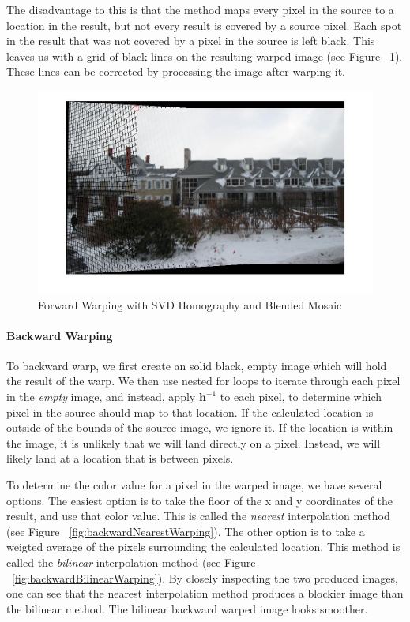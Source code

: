 \documentclass[11pt, letterpaper]{article}
\begin{document}
The disadvantage to this is that the method maps every pixel in the
source to a location in the result, but not every result is covered by
a source pixel. Each spot in the result that was not covered by a
pixel in the source is left black. This leaves us with a grid of black
lines on the resulting warped image (see Figure
~\ref{fig:forwardWarping}). These lines can be corrected by processing
the image after warping it.

\begin{figure}[here]
\includegraphics[width=\textwidth]{../pics/snow-svd-forward-blended.jpg}
\caption{Forward Warping with SVD Homography and Blended Mosaic}
\label{fig:forwardWarping}
\end{figure}

\paragraph{Backward Warping}
To backward warp, we first create an solid black, empty image which
will hold the result of the warp. We then use nested for loops to
iterate through each pixel in the \emph{empty} image, and instead,
apply $\mathbf{h}^{-1}$ to each pixel, to determine which pixel in the
source should map to that location. If the calculated location is
outside of the bounds of the source image, we ignore it. If the
location is within the image, it is unlikely that we will land
directly on a pixel. Instead, we will likely land at a location that
is between pixels. 

To determine the color value for a pixel in the warped image, we have
several options. The easiest option is to take the floor of the x and
y coordinates of the result, and use that color value. This is called
the \emph{nearest} interpolation method (see Figure
~\ref{fig:backwardNearestWarping}). The other option is to take a
weigted average of the pixels surrounding the calculated
location. This method is called the \emph{bilinear} interpolation
method (see Figure ~\ref{fig:backwardBilinearWarping}). By closely
inspecting the two produced images, one can see that the nearest
interpolation method produces a blockier image than the bilinear
method. The bilinear backward warped image looks smoother.
\end{document}

